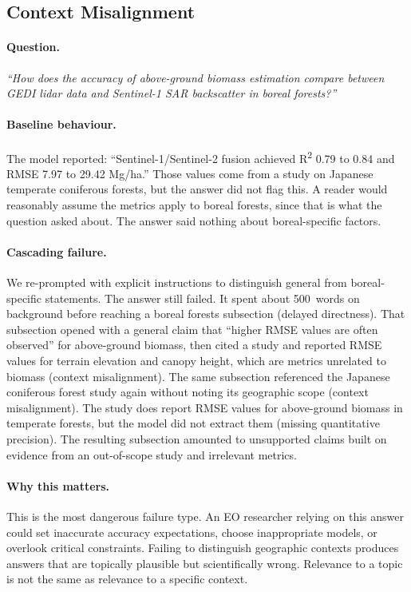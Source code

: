 \subsection{Context Misalignment}
\label{subsec:context-misalignment-example}

\paragraph{Question.} \textit{``How does the accuracy of above-ground biomass estimation compare between GEDI lidar data and Sentinel-1 SAR backscatter in boreal forests?''}

\paragraph{Baseline behaviour.} The model reported: ``Sentinel-1/Sentinel-2 fusion achieved R\textsuperscript{2} 0.79 to 0.84 and RMSE 7.97 to 29.42 Mg/ha.'' Those values come from a study on Japanese temperate coniferous forests, but the answer did not flag this. A reader would reasonably assume the metrics apply to boreal forests, since that is what the question asked about. The answer said nothing about boreal-specific factors.

\paragraph{Cascading failure.} We re-prompted with explicit instructions to distinguish general from boreal-specific statements. The answer still failed. It spent about 500~words on background before reaching a boreal forests subsection (delayed directness). That subsection opened with a general claim that ``higher RMSE values are often observed'' for above-ground biomass, then cited a study and reported RMSE values for terrain elevation and canopy height, which are metrics unrelated to biomass (context misalignment). The same subsection referenced the Japanese coniferous forest study again without noting its geographic scope (context misalignment). The study does report RMSE values for above-ground biomass in temperate forests, but the model did not extract them (missing quantitative precision). The resulting subsection amounted to unsupported claims built on evidence from an out-of-scope study and irrelevant metrics.

\paragraph{Why this matters.} This is the most dangerous failure type. An EO researcher relying on this answer could set inaccurate accuracy expectations, choose inappropriate models, or overlook critical constraints. Failing to distinguish geographic contexts produces answers that are topically plausible but scientifically wrong. Relevance to a topic is not the same as relevance to a specific context.

